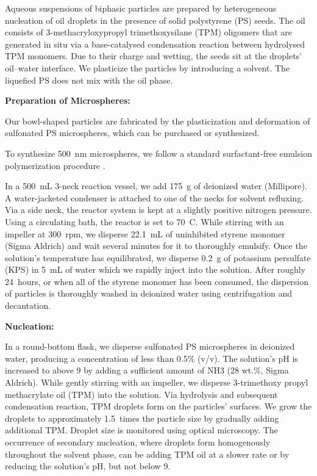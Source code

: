 \documentclass[aps,pre,preprint,superscriptaddress,nofootinbib]{revtex4-1}
\begin{document}
Aqueous suspensions of biphasic particles are prepared by heterogeneous nucleation of oil droplets in the presence of solid polystyrene (PS) seeds. The oil consists of 3-methacryloxypropyl trimethoxysilane (TPM) oligomers that are generated in situ via a base-catalysed condensation reaction between hydrolysed TPM monomers.
Due to their charge and wetting, the seeds sit at the droplets' oil–water interface.
We plasticize the particles by introducing a solvent.
The liquefied PS does not mix with the oil phase.


\textbf{Preparation of Microspheres:}

Our bowl-shaped particles are fabricated by the plasticization and deformation of sulfonated PS microspheres, which can be purchased or synthesized.

To synthesize 500~nm microspheres, we follow a standard surfactant-free emulsion polymerization procedure \cite{Song1990Kinetics}.

In a 500~mL 3-neck reaction vessel, we add 175~g of deionized water (Millipore).
A water-jacketed condenser is attached to one of the necks for solvent refluxing.
Via a side neck, the reactor system is kept at a slightly positive nitrogen pressure.
Using a circulating bath, the reactor is set to 70~C. While stirring with an impeller at 300~rpm, we disperse 22.1~mL of uninhibited styrene monomer (Sigma Aldrich) and wait several minutes for it to thoroughly emulsify.
Once the solution's temperature has equilibrated, we disperse 0.2~g of potassium persulfate (KPS) in 5~mL of water which we rapidly inject into the solution.
After roughly 24~hours, or when all of the styrene monomer has been consumed, the dispersion of particles is thoroughly washed in deionized water using centrifugation and decantation. 


\textbf{Nucleation:}

In a round-bottom flask, we disperse sulfonated PS microspheres in deionized water, producing a concentration of less than 0.5\% (v/v).
The solution's pH is increased to above 9 by adding a sufficient amount of NH3 (28 wt.\%, Sigma Aldrich).
While gently stirring with an impeller, we disperse 3-trimethoxy propyl methacrylate oil (TPM) into the solution.
Via hydrolysis and subsequent condensation reaction, TPM droplets form on the particles' surfaces.
We grow the droplets to approximately 1.5~times the particle size by gradually adding additional TPM.
Droplet size is monitored using optical microscopy.
The occurrence of secondary nucleation, where droplets form homogenously throughout the solvent phase, can be adding TPM oil at a slower rate or by reducing the solution's pH, but not below 9.
\end{document}
